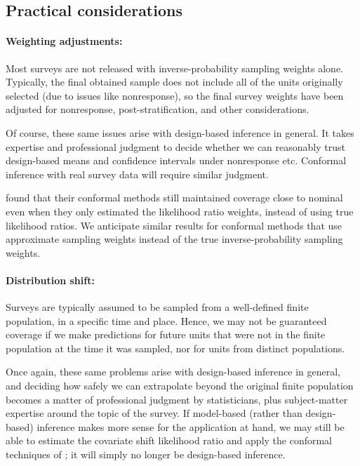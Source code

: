 \documentclass[10.5pt, letterpaper]{article}
\numberwithin{table}{section}
\numberwithin{figure}{section}
\numberwithin{equation}{section}
\begin{document}
\subsection{Practical considerations}

\paragraph{Weighting adjustments:} Most surveys are not released with inverse-probability sampling weights alone. Typically, the final obtained sample does not include all of the units originally selected (due to issues like nonresponse), so the final survey weights have been adjusted for nonresponse, post-stratification, and other considerations.

Of course, these same issues arise with design-based inference in general. It takes expertise and professional judgment to decide whether we can reasonably trust design-based means and confidence intervals under nonresponse etc. Conformal inference with real survey data will require similar judgment.

\cite{tibshirani2019conformal} found that their conformal methods still maintained coverage close to nominal even when they only estimated the likelihood ratio weights, instead of using true likelihood ratios. We anticipate similar results for conformal methods that use approximate sampling weights instead of the true inverse-probability sampling weights.


\paragraph{Distribution shift:} Surveys are typically assumed to be sampled from a well-defined finite population, in a specific time and place. Hence, we may not be guaranteed coverage if we make predictions for future units that were not in the finite population at the time it was sampled, nor for units from distinct populations.

Once again, these same problems arise with design-based inference in general, and deciding how safely we can extrapolate beyond the original finite population becomes a matter of professional judgment by statisticians, plus subject-matter expertise around the topic of the survey. If model-based (rather than design-based) inference makes more sense for the application at hand, we may still be able to estimate the covariate shift likelihood ratio and apply the conformal techniques of \cite{tibshirani2019conformal}; it will simply no longer be design-based inference.
\end{document}
